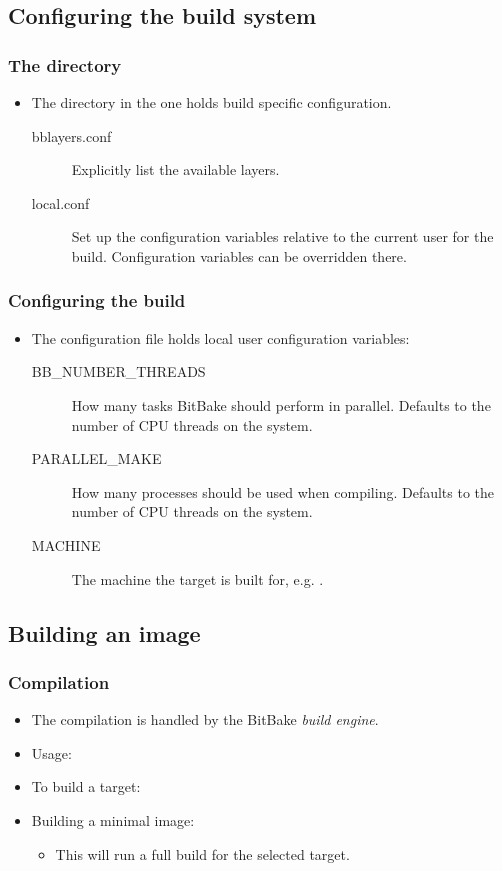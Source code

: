 \subsection{Configuring the build system}

\begin{frame}
  \frametitle{The  directory}
  \begin{itemize}
    \item The  directory in the  one holds 
      build specific configuration.
    \begin{description}
      \item[bblayers.conf] Explicitly list the available layers.
      \item[local.conf] Set up the configuration variables relative to
        the current user for the build. Configuration variables can be
        overridden there.
    \end{description}
  \end{itemize}
\end{frame}

\begin{frame}
  \frametitle{Configuring the build}
  \begin{itemize}
    \item The  configuration file holds local
    user configuration variables:
    \begin{description}
      \item[BB\_NUMBER\_THREADS] How many tasks BitBake should perform
        in parallel. Defaults to the number of CPU threads on the system.
      \item[PARALLEL\_MAKE] How many processes should be used when
        compiling. Defaults to the number of CPU threads on the system.
      \item[MACHINE] The machine the target is built for, e.g.
        .
    \end{description}
  \end{itemize}
\end{frame}

\subsection{Building an image}

\begin{frame}
  \frametitle{Compilation}
  \begin{itemize}
    \item The compilation is handled by the BitBake {\em build
      engine}.
    \item Usage: 
    \item To build a target: 
    \item Building a minimal image: 
    \begin{itemize}
      \item This will run a full build for the selected target.
    \end{itemize}
  \end{itemize}
\end{frame}
